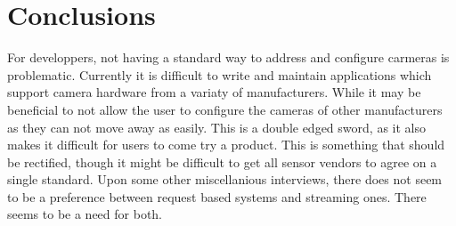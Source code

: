 \section{Conclusions}
For developpers, not having a standard way to address and configure carmeras is
problematic. Currently it is difficult to write and maintain applications which
support camera hardware from a variaty of manufacturers. While it may be
beneficial to not allow the user to configure the cameras of other
manufacturers as they can not move away as easily. This is a double edged
sword, as it also makes it difficult for users to come try a product. This is
something that should be rectified, though it might be difficult to get all
sensor vendors to agree on a single standard. Upon some other miscellanious
interviews, there does not seem to be a preference between request based
systems and streaming ones. There seems to be a need for both.
